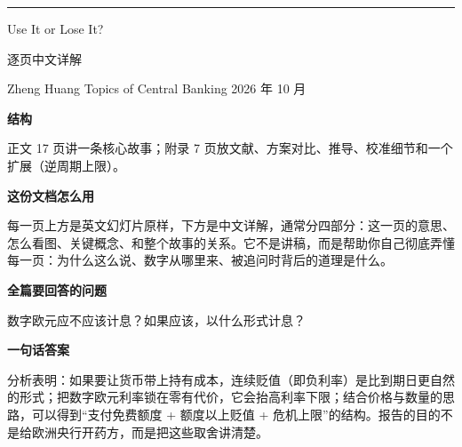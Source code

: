 \documentclass[a4paper,10.5pt,fontset=none]{ctexart}
\newcommand{\quiet}[1]{{\color{quiet}#1}}
\newcommand{\hl}[1]{{\color{accent}#1}}
\newcommand{\kicker}[1]{{\small\bfseries\color{accent}#1}}
\begin{document}
{\color{accent}\rule{1.6cm}{1.2pt}}\par\medskip
{\fontsize{24}{30}\selectfont Use It or Lose It?}\par\smallskip
{\large\quiet{逐页中文详解}}\par\medskip
{\small Zheng Huang \textperiodcentered{} Topics of Central Banking \textperiodcentered{} 2026 年 10 月}

\vspace{0.4cm}
\kicker{结构}

正文 17 页讲一条核心故事；附录 7 页放文献、方案对比、推导、校准细节和一个扩展（逆周期上限）。

\vspace{0.8cm}
\kicker{这份文档怎么用}

每一页上方是英文幻灯片原样，下方是中文详解，通常分四部分：\hl{这一页的意思}、\hl{怎么看图}、\hl{关键概念}、\hl{和整个故事的关系}。它不是讲稿，而是帮助你自己彻底弄懂每一页：为什么这么说、数字从哪里来、被追问时背后的道理是什么。

\vspace{0.4cm}
\kicker{全篇要回答的问题}

数字欧元应不应该计息？如果应该，以什么形式计息？

\vspace{0.4cm}
\kicker{一句话答案}

分析表明：如果要让货币带上持有成本，连续贬值（即负利率）是比到期日更自然的形式；把数字欧元利率锁在零有代价，它会抬高利率下限；结合价格与数量的思路，可以得到“支付免费额度 + 额度以上贬值 + 危机上限”的结构。报告的目的不是给欧洲央行开药方，而是把这些取舍讲清楚。
\end{document}
